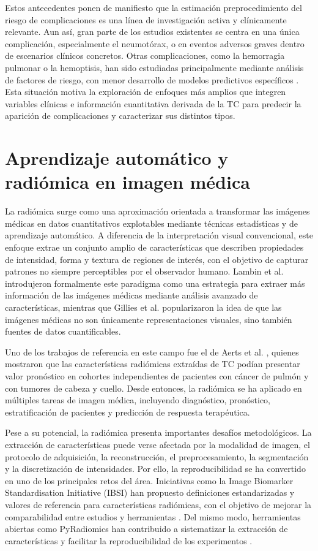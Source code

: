 Estos antecedentes ponen de manifiesto que la estimación preprocedimiento del riesgo de complicaciones es una línea de investigación activa y clínicamente relevante. Aun así, gran parte de los estudios existentes se centra en una única complicación, especialmente el neumotórax, o en eventos adversos graves dentro de escenarios clínicos concretos. Otras complicaciones, como la hemorragia pulmonar o la hemoptisis, han sido estudiadas principalmente mediante análisis de factores de riesgo, con menor desarrollo de modelos predictivos específicos \cite{Yeow2004,Zhu2020}. Esta situación motiva la exploración de enfoques más amplios que integren variables clínicas e información cuantitativa derivada de la TC para predecir la aparición de complicaciones y caracterizar sus distintos tipos.

\section{Aprendizaje automático y radiómica en imagen médica}

La radiómica surge como una aproximación orientada a transformar las imágenes médicas en datos cuantitativos explotables mediante técnicas estadísticas y de aprendizaje automático. A diferencia de la interpretación visual convencional, este enfoque extrae un conjunto amplio de características que describen propiedades de intensidad, forma y textura de regiones de interés, con el objetivo de capturar patrones no siempre perceptibles por el observador humano. Lambin et al. \cite{Lambin2012} introdujeron formalmente este paradigma como una estrategia para extraer más información de las imágenes médicas mediante análisis avanzado de características, mientras que Gillies et al. \cite{Gillies2016} popularizaron la idea de que las imágenes médicas no son únicamente representaciones visuales, sino también fuentes de datos cuantificables.

Uno de los trabajos de referencia en este campo fue el de Aerts et al. \cite{Aerts2014}, quienes mostraron que las características radiómicas extraídas de TC podían presentar valor pronóstico en cohortes independientes de pacientes con cáncer de pulmón y con tumores de cabeza y cuello. Desde entonces, la radiómica se ha aplicado en múltiples tareas de imagen médica, incluyendo diagnóstico, pronóstico, estratificación de pacientes y predicción de respuesta terapéutica.

Pese a su potencial, la radiómica presenta importantes desafíos metodológicos. La extracción de características puede verse afectada por la modalidad de imagen, el protocolo de adquisición, la reconstrucción, el preprocesamiento, la segmentación y la discretización de intensidades. Por ello, la reproducibilidad se ha convertido en uno de los principales retos del área. Iniciativas como la Image Biomarker Standardisation Initiative (IBSI) han propuesto definiciones estandarizadas y valores de referencia para características radiómicas, con el objetivo de mejorar la comparabilidad entre estudios y herramientas \cite{Zwanenburg2020}. Del mismo modo, herramientas abiertas como PyRadiomics han contribuido a sistematizar la extracción de características y facilitar la reproducibilidad de los experimentos \cite{VanGriethuysen2017}.

